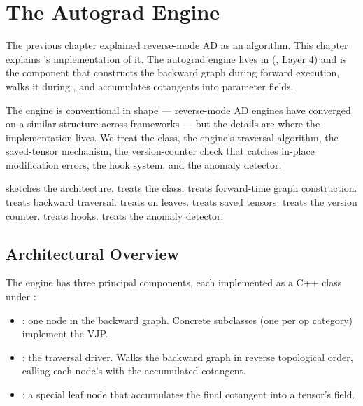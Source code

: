 \chapter{The Autograd Engine}
\label{ch:autograd_engine}

The previous chapter explained reverse-mode AD as an algorithm.
This chapter explains \Lucid's implementation of it. The autograd
engine lives in  (,
Layer 4) and is the component that constructs the backward graph
during forward execution, walks it during , and
accumulates cotangents into parameter  fields.

The engine is conventional in shape --- reverse-mode AD engines
have converged on a similar structure across frameworks --- but
the details are where the implementation lives. We treat the
 class, the engine's traversal algorithm, the
saved-tensor mechanism, the version-counter check that catches
in-place modification errors, the hook system, and the anomaly
detector.

 sketches the architecture.
 treats the  class.
 treats forward-time
graph construction.
 treats backward traversal.
 treats
 on leaves.
 treats saved tensors.
 treats the version counter.
 treats hooks.
 treats the anomaly detector.

\section{Architectural Overview}
\label{sec:autograd_engine:overview}

The engine has three principal components, each implemented as a
C++ class under :

\begin{itemize}
  \item {}: one node in the backward graph. Concrete
    subclasses (one per op category) implement the VJP.
  \item {}: the traversal driver. Walks the backward
    graph in reverse topological order, calling each node's
     with the accumulated cotangent.
  \item {}: a special leaf node that
    accumulates the final cotangent into a tensor's 
    field.
\end{itemize}

